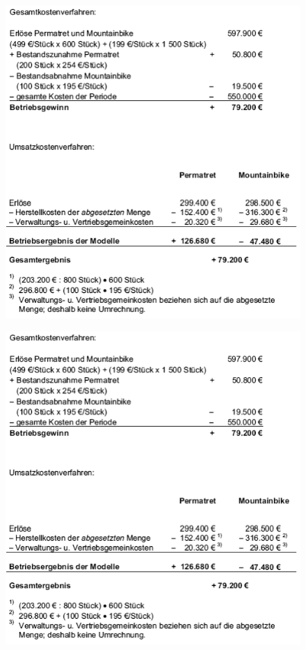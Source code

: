 \documentclass[a4paper,11pt, twoside]{article}
\begin{document}
\begin{figure}[h]
 \begin{center}
   \includegraphics[scale=0.5]{bilder/beispiel_betriebsergebnisrechnung2.png}
 \end{center}
\end{figure}

\begin{figure}[h]
 \begin{center}
   \includegraphics[scale=0.5]{bilder/beispiel_betriebsergebnisrechnung2.png}
 \end{center}
\end{figure}
\end{document}
